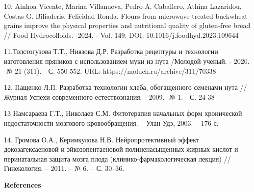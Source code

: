 \begin{references}
10. Ainhoa Vicente, Marina Villanueva, Pedro A. Caballero, Athina
Lazaridou, Costas G. Biliaderis, Felicidad Ronda. Flours from
microwave-treated buckwheat grains improve the physical properties and
nutritional quality of gluten-free bread // Food Hydrocolloids. -2024. -
Vol. 149. \linebreak DOI: 10.1016/j.foodhyd.2023.109644

11.Толстогузова Т.Т., Ниязова Д.Р. Разработка рецептуры и технологии
изготовления пряников с использованием муки из нута /Молодой ученый. -
2020. -№ 21 (311). - С. 550-552. \linebreak  URL:
https://moluch.ru/archive/311/70338

12. Пащенко Л.П. Разработка технологии хлеба, обогащенного семенами нута
//Журнал Успехи современного естествознания. - 2009. -№ 1. - С. 24-38

13 Намсараева Г.Т., Николаев С.М. Фитотерапия начальных форм хронической
недостаточности мозгового кровообращения. -- Улан-Удэ, 2003. -- 176 с.

14. Громова О.А., Керимкулова Н.В. Нейропротективный эффект
докозагексаеновой и эйкозопентаеновой полиненасыщенных жирных кислот и
перинатальная защита мозга плода (клинико-\linebreak фармакологическая лекция) //
Гинекология. -- 2011. -- № 6. -- С. 30--36.

\end{references}

\begin{center}
{\bfseries References}
\end{center}

